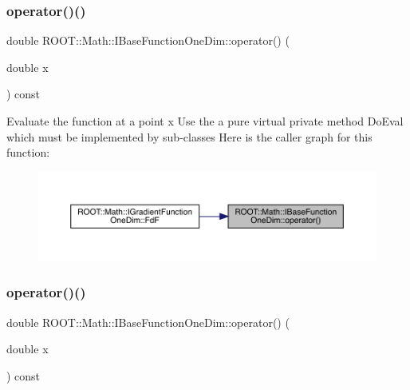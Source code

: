 \mbox{\label{classROOT_1_1Math_1_1IBaseFunctionOneDim_ac7f3be3ec5ab92d04ebb33f6615d59c2}} 
\subsubsection{\texorpdfstring{operator()()}{operator()()}\hspace{0.1cm}{\footnotesize\ttfamily [1/6]}}
{\footnotesize\ttfamily double R\+O\+O\+T\+::\+Math\+::\+I\+Base\+Function\+One\+Dim\+::operator() (\begin{DoxyParamCaption}\item[{double}]{x }\end{DoxyParamCaption}) const\hspace{0.3cm}{\ttfamily [inline]}}

Evaluate the function at a point x Use the a pure virtual private method Do\+Eval which must be implemented by sub-\/classes Here is the caller graph for this function\+:
\nopagebreak
\begin{figure}[H]
\begin{center}
\leavevmode
\includegraphics[width=350pt]{d0/dd5/classROOT_1_1Math_1_1IBaseFunctionOneDim_ac7f3be3ec5ab92d04ebb33f6615d59c2_icgraph}
\end{center}
\end{figure}
\mbox{\label{classROOT_1_1Math_1_1IBaseFunctionOneDim_ac7f3be3ec5ab92d04ebb33f6615d59c2}} 
\subsubsection{\texorpdfstring{operator()()}{operator()()}\hspace{0.1cm}{\footnotesize\ttfamily [2/6]}}
{\footnotesize\ttfamily double R\+O\+O\+T\+::\+Math\+::\+I\+Base\+Function\+One\+Dim\+::operator() (\begin{DoxyParamCaption}\item[{double}]{x }\end{DoxyParamCaption}) const\hspace{0.3cm}{\ttfamily [inline]}}

